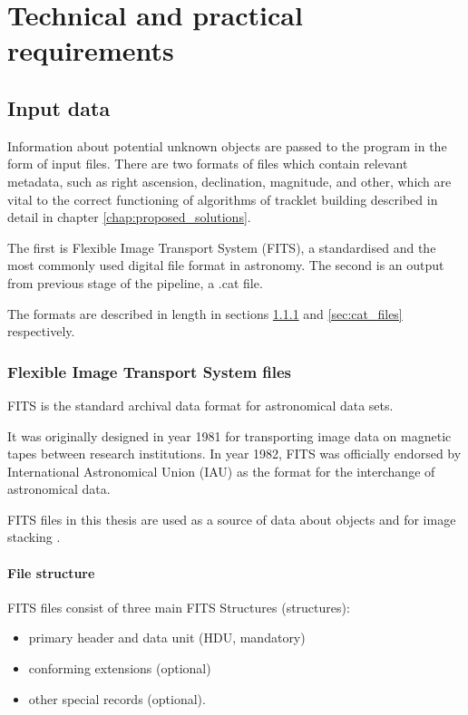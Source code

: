 \chapter{Technical and practical requirements}\label{chap:requirements}


\section{Input data}\label{sec:input_data}

	Information about potential unknown objects are passed to the program in the form of input files. There are two formats of files which contain relevant metadata, such as right ascension, declination, magnitude, and other, which are vital to the correct functioning of algorithms of tracklet building described in detail in chapter \ref{chap:proposed_solutions}. 
	
	The first is Flexible Image Transport System (FITS), a standardised and the most commonly used digital file format in astronomy. The second is an output from previous stage of the pipeline, a .cat file. 
	
	The formats are described in length in sections \ref{sec:fits_files} and \ref{sec:cat_files} respectively.
	
\subsection{Flexible Image Transport System files}\label{sec:fits_files}
	
	FITS is the standard archival data format for astronomical data sets. 
	
	It was originally designed in year 1981 for transporting image data on magnetic tapes between research institutions. In year 1982, FITS was officially endorsed by International Astronomical Union (IAU) as the format for the interchange of astronomical data.
	
	FITS files in this thesis are used as a source of data about objects and for image stacking \citep{FITSdefinition}.
	
\subsubsection{File structure}

	FITS files consist of three main FITS Structures (structures):
	
	\begin{itemize}
		\item primary header and data unit (HDU, mandatory)
		\item conforming extensions (optional)
		\item other special records (optional).
	\end{itemize}
	
